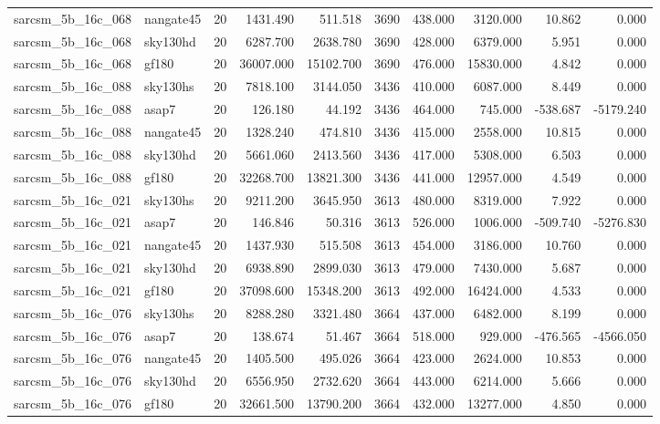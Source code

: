 \begin{longtable}{llrrrrrrrr}
sarcsm\_5b\_16c\_068 & nangate45 & 20 & 1431.490 & 511.518 & 3690 & 438.000 & 3120.000 & 10.862 & 0.000 \\
sarcsm\_5b\_16c\_068 & sky130hd & 20 & 6287.700 & 2638.780 & 3690 & 428.000 & 6379.000 & 5.951 & 0.000 \\
sarcsm\_5b\_16c\_068 & gf180 & 20 & 36007.000 & 15102.700 & 3690 & 476.000 & 15830.000 & 4.842 & 0.000 \\
sarcsm\_5b\_16c\_088 & sky130hs & 20 & 7818.100 & 3144.050 & 3436 & 410.000 & 6087.000 & 8.449 & 0.000 \\
sarcsm\_5b\_16c\_088 & asap7 & 20 & 126.180 & 44.192 & 3436 & 464.000 & 745.000 & -538.687 & -5179.240 \\
sarcsm\_5b\_16c\_088 & nangate45 & 20 & 1328.240 & 474.810 & 3436 & 415.000 & 2558.000 & 10.815 & 0.000 \\
sarcsm\_5b\_16c\_088 & sky130hd & 20 & 5661.060 & 2413.560 & 3436 & 417.000 & 5308.000 & 6.503 & 0.000 \\
sarcsm\_5b\_16c\_088 & gf180 & 20 & 32268.700 & 13821.300 & 3436 & 441.000 & 12957.000 & 4.549 & 0.000 \\
sarcsm\_5b\_16c\_021 & sky130hs & 20 & 9211.200 & 3645.950 & 3613 & 480.000 & 8319.000 & 7.922 & 0.000 \\
sarcsm\_5b\_16c\_021 & asap7 & 20 & 146.846 & 50.316 & 3613 & 526.000 & 1006.000 & -509.740 & -5276.830 \\
sarcsm\_5b\_16c\_021 & nangate45 & 20 & 1437.930 & 515.508 & 3613 & 454.000 & 3186.000 & 10.760 & 0.000 \\
sarcsm\_5b\_16c\_021 & sky130hd & 20 & 6938.890 & 2899.030 & 3613 & 479.000 & 7430.000 & 5.687 & 0.000 \\
sarcsm\_5b\_16c\_021 & gf180 & 20 & 37098.600 & 15348.200 & 3613 & 492.000 & 16424.000 & 4.533 & 0.000 \\
sarcsm\_5b\_16c\_076 & sky130hs & 20 & 8288.280 & 3321.480 & 3664 & 437.000 & 6482.000 & 8.199 & 0.000 \\
sarcsm\_5b\_16c\_076 & asap7 & 20 & 138.674 & 51.467 & 3664 & 518.000 & 929.000 & -476.565 & -4566.050 \\
sarcsm\_5b\_16c\_076 & nangate45 & 20 & 1405.500 & 495.026 & 3664 & 423.000 & 2624.000 & 10.853 & 0.000 \\
sarcsm\_5b\_16c\_076 & sky130hd & 20 & 6556.950 & 2732.620 & 3664 & 443.000 & 6214.000 & 5.666 & 0.000 \\
sarcsm\_5b\_16c\_076 & gf180 & 20 & 32661.500 & 13790.200 & 3664 & 432.000 & 13277.000 & 4.850 & 0.000 \\

\end{longtable}
